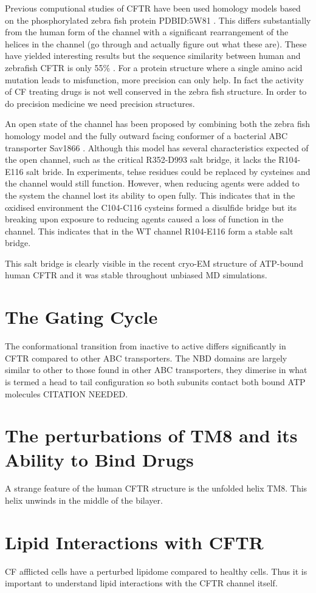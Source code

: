 Previous computional studies of CFTR have been used homology models based on the phosphorylated zebra fish protein PDBID:5W81 \cite{Zhang2017}. This differs substantially from the human form of the channel with a significant rearrangement of the helices in the channel (go through and actually figure out what these are). These have yielded interesting results but the sequence similarity between human and zebrafish CFTR is only 55\% \cite{}. For a protein structure where a single amino acid mutation leads to misfunction, more precision can only help. In fact the activity of CF treating drugs is not well conserved in the zebra fish structure. In order to do precision medicine we need precision structures. 

An open state of the channel has been proposed by combining both the zebra fish homology model and the fully outward facing conformer of a bacterial ABC transporter Sav1866 \cite{Hoffman2018}. Although this model has several characteristics expected of the open channel, such as the critical R352-D993 salt bridge, it lacks the R104-E116 salt bride. In experiments, tehse residues could be replaced by cysteines and the channel would still function. However, when reducing agents were added to the system the channel lost its ability to open fully. This indicates that in the oxidised environment the C104-C116 cysteins formed a disulfide bridge but its breaking upon exposure to reducing agents caused a loss of function in the channel. This indicates that in the WT channel R104-E116 form a stable salt bridge. 

This salt bridge is clearly visible in the recent cryo-EM structure of ATP-bound human CFTR \cite{Zhang2018} and it was stable throughout unbiased MD simulations.

\section{The Gating Cycle}
The conformational transition from inactive to active differs significantly in CFTR compared to other ABC transporters. The NBD domains are largely similar to other to those found in other ABC transporters, they dimerise in what is termed a head to tail configuration so both subunits contact both bound ATP molecules CITATION NEEDED. 

\section{The perturbations of TM8 and its Ability to Bind Drugs}
A strange feature of the human CFTR structure is the unfolded helix TM8. This helix unwinds in the middle of the bilayer. 



\section{Lipid Interactions with CFTR}
CF afflicted cells have a perturbed lipidome compared to healthy cells.\cite{Cottrill2020} Thus it is important to understand lipid interactions with the CFTR channel itself.
